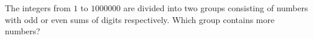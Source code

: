 The integers from $1$ to $1000000$ are divided into two groups consisting of numbers with odd or even sums of digits respectively. Which group contains more numbers?